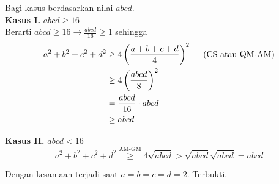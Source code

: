 
\begin{solusi}
    Bagi kasus berdasarkan nilai $abcd$.\\
    \textbf{Kasus I.} $abcd \ge 16$\\
    Berarti $abcd \ge 16 \rightarrow \frac{abcd}{16} \ge 1$ sehingga
    \begin{align*}
    a^2+b^2+c^2+d^2 &\ge 4\left(\frac{a+b+c+d}{4}\right)^2 \hspace{0.5cm}\text{(CS atau QM-AM)}\\
    &\ge 4\left(\frac{abcd}{8}\right)^2 \\
    &= \frac{abcd}{16} \cdot abcd\\
    &\ge abcd
    \end{align*}


    \textbf{Kasus II.} $abcd < 16$
    \[ a^2+b^2+c^2+d^2 \stackrel{\text{AM-GM}}{\ge} 4\sqrt{abcd} > \sqrt{abcd}\sqrt{abcd} = abcd \]

    Dengan kesamaan terjadi saat $a=b=c=d=2$. Terbukti.
\end{solusi}